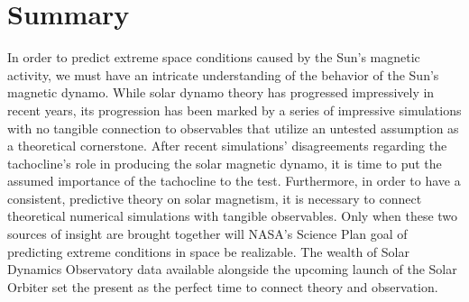 \documentclass[aasms,12pt]{article}
\begin{document}
\section{Summary}
In order to predict extreme space conditions caused by the Sun's magnetic
activity, we must have an intricate understanding of the behavior of the Sun's
magnetic dynamo.  While solar dynamo theory has progressed impressively in
recent years, its progression has been marked by
a series of impressive simulations with no tangible connection to
observables that utilize an untested assumption as a theoretical cornerstone.
After recent simulations' disagreements regarding the 
tachocline's role in producing the solar magnetic dynamo, it is time
to put the assumed importance of the tachocline to the test.  Furthermore,
in order to have a
consistent, predictive theory on solar magnetism, it
is necessary to connect theoretical numerical simulations with tangible 
observables.  Only when these two sources of insight are brought together
will NASA's Science Plan goal of predicting extreme conditions in space
be realizable.  The wealth of Solar Dynamics
Observatory data available alongside the upcoming launch of the Solar Orbiter
set the present as the perfect time to connect theory and observation. 



\begingroup
\renewcommand{\section}[2]{}%
\begin{footnotesize}

\end{footnotesize}
\endgroup
\end{document}
